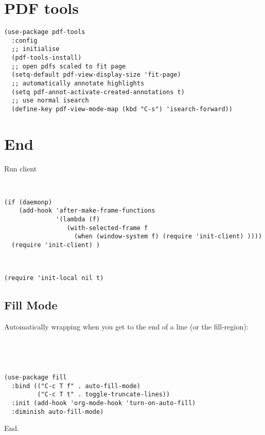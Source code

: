 \documentclass[12pt]{article}
\begin{document}
\section{PDF tools}
\label{sec:org1852924}

\begin{verbatim}
(use-package pdf-tools
  :config
  ;; initialise
  (pdf-tools-install)
  ;; open pdfs scaled to fit page
  (setq-default pdf-view-display-size 'fit-page)
  ;; automatically annotate highlights
  (setq pdf-annot-activate-created-annotations t)
  ;; use normal isearch
  (define-key pdf-view-mode-map (kbd "C-s") 'isearch-forward))
\end{verbatim}

\section{End}
\label{sec:org925755f}


Run client

\begin{verbatim}


(if (daemonp)
    (add-hook 'after-make-frame-functions
              '(lambda (f)
                 (with-selected-frame f
                   (when (window-system f) (require 'init-client) ))))
  (require 'init-client) )



\end{verbatim}

\begin{verbatim}
(require 'init-local nil t)
\end{verbatim}






\subsection{Fill Mode}
\label{sec:orgf516965}
Automatically wrapping when you get to the end of a line (or the fill-region):


\begin{verbatim}




(use-package fill
  :bind (("C-c T f" . auto-fill-mode)
         ("C-c T t" . toggle-truncate-lines))
  :init (add-hook 'org-mode-hook 'turn-on-auto-fill)
  :diminish auto-fill-mode)

\end{verbatim}


End. 
\end{document}
